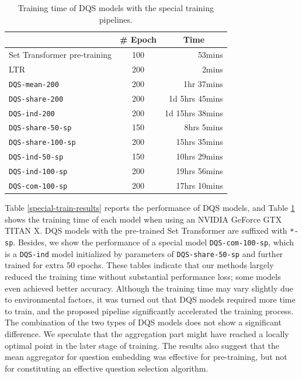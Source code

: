 \begin{table}[t]
\caption{Training time of DQS models with the special training pipelines.}
\centering
\begin{tabular}{lcr}
\hline
                            & \# Epoch & \multicolumn{1}{c}{Time} \\ \hline
Set Transformer pre-training & 100      & 53mins                   \\
\midrule
LTR                  & 200       & 2mins                  \\
\texttt{DQS-mean-200}                & 200      & 1hr 37mins               \\
\texttt{DQS-share-200}               & 200      & 1d 5hrs 45mins          \\
\texttt{DQS-ind-200}                 & 200      & 1d 15hrs 38mins          \\
\midrule
\texttt{DQS-share-50-sp}             & 150      & 8hrs 5mins              \\
\texttt{DQS-share-100-sp}            & 200      & 15hrs  35mins            \\
\texttt{DQS-ind-50-sp}               & 150      & 10hrs 29mins             \\
\texttt{DQS-ind-100-sp}              & 200      & 19hrs  56mins            \\
\texttt{DQS-com-100-sp}              & 200      & 17hrs 10mins             \\ \hline
\end{tabular}
\label{cost-time}
\end{table}

Table \ref{special-train-results} reports the performance of DQS models,
and Table \ref{cost-time} shows the training time of each model when using an NVIDIA GeForce GTX TITAN X.
DQS models with the pre-trained Set Transformer are suffixed with \texttt{*-sp}.
Besides, we show the performance of a special model \texttt{DQS-com-100-sp},
which is a \texttt{DQS-ind} model initialized by parameters of \texttt{DQS-share-50-sp} and further trained for extra 50 epochs. 
These tables indicate that our methods largely reduced the training time without substantial performance loss; some models even achieved better accuracy. 
Although the training time may vary slightly due to environmental factors, 
it was turned out that DQS models required more time to train, 
and the proposed pipeline significantly accelerated the training process.
The combination of the two types of DQS models does not show a significant difference. 
We speculate that the aggregation part might have reached a locally optimal point in the later stage of training.
The results also suggest that the mean aggregator for question embedding was effective for pre-training, but not for constituting an effective question selection algorithm.

